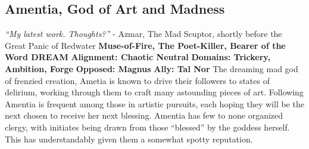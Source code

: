 \subsection{Amentia, God of Art and Madness}\label{god:amentia}
\textit{“My latest work. Thoughts?”}
\break
\hspace*{\fill}- Azmar, The Mad Scuptor, shortly before the Great Panic of Redwater
\break
\break
\textbf{Muse-of-Fire, The Poet-Killer, Bearer of the Word DREAM}\break
\hspace*{\fill}\break
\textbf{Alignment:\hspace*{\fill} Chaotic Neutral} \break
\textbf{Domains:\hspace*{\fill} Trickery, Ambition, Forge} \break
\textbf{Opposed:\hspace*{\fill} Magnus} \break
\textbf{Ally:\hspace*{\fill} Tal Nor} \break
\hspace*{\fill}\break
The dreaming mad god of frenzied creation, Ametia is known to drive their followers to states of delirium, working through them to craft many astounding pieces of art.  \newline
Following Amentia is frequent among those in artistic pursuits, each hoping they will be the next chosen to receive her next blessing. \newline
Amentia has few to none organized clergy, with initiates being drawn from those “blessed” by the goddess herself. This has understandably given them a somewhat spotty reputation. 

